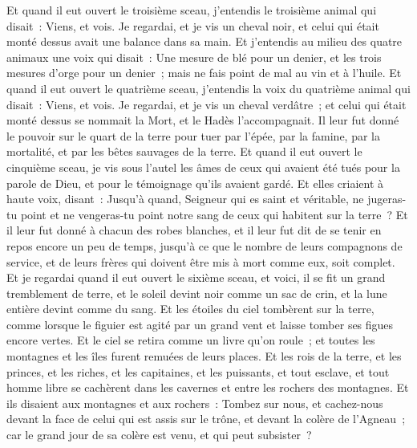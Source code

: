 \begin{multicols}{2}
Et quand il eut ouvert le troisième sceau, j'entendis le troisième animal qui disait~: Viens, et vois. Je regardai, et je vis un cheval noir, et celui qui était monté dessus avait une balance dans sa main.
Et j'entendis au milieu des quatre animaux une voix qui disait~: Une mesure de blé pour un denier, et les trois mesures d'orge pour un denier~; mais ne fais point de mal au vin et à l'huile.
Et quand il eut ouvert le quatrième sceau, j'entendis la voix du quatrième animal qui disait~: Viens, et vois.
Je regardai, et je vis un cheval verdâtre~; et celui qui était monté dessus se nommait la Mort, et le Hadès l'accompagnait. Il leur fut donné le pouvoir sur le quart de la terre pour tuer par l'épée, par la famine, par la mortalité, et par les bêtes sauvages de la terre.
Et quand il eut ouvert le cinquième sceau, je vis sous l'autel les âmes de ceux qui avaient été tués pour la parole de Dieu, et pour le témoignage qu'ils avaient gardé.
Et elles criaient à haute voix, disant~: Jusqu'à quand, Seigneur qui es saint et véritable, ne jugeras-tu point et ne vengeras-tu point notre sang de ceux qui habitent sur la terre~?
Et il leur fut donné à chacun des robes blanches, et il leur fut dit de se tenir en repos encore un peu de temps, jusqu'à ce que le nombre de leurs compagnons de service, et de leurs frères qui doivent être mis à mort comme eux, soit complet.
Et je regardai quand il eut ouvert le sixième sceau, et voici, il se fit un grand tremblement de terre, et le soleil devint noir comme un sac de crin, et la lune entière devint comme du sang.
Et les étoiles du ciel tombèrent sur la terre, comme lorsque le figuier est agité par un grand vent et laisse tomber ses figues encore vertes.
Et le ciel se retira comme un livre qu'on roule~; et toutes les montagnes et les îles furent remuées de leurs places.
Et les rois de la terre, et les princes, et les riches, et les capitaines, et les puissants, et tout esclave, et tout homme libre se cachèrent dans les cavernes et entre les rochers des montagnes.
Et ils disaient aux montagnes et aux rochers~: Tombez sur nous, et cachez-nous devant la face de celui qui est assis sur le trône, et devant la colère de l'Agneau~;
car le grand jour de sa colère est venu, et qui peut subsister~?

\end{multicols}
